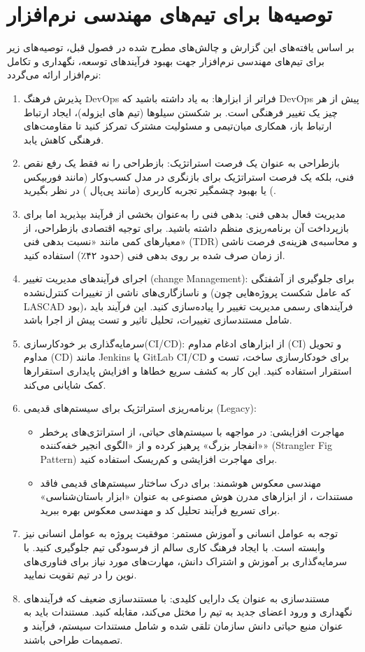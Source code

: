 \section{توصیه‌ها برای تیم‌های مهندسی نرم‌افزار}
\label{sec:ch6-recommendations}

بر اساس یافته‌های این گزارش و چالش‌های مطرح شده در فصول قبل، توصیه‌های زیر برای تیم‌های مهندسی نرم‌افزار جهت بهبود فرآیندهای توسعه، نگهداری و تکامل نرم‌افزار ارائه می‌گردد:

\begin{enumerate}
    \item پذیرش فرهنگ DevOps فراتر از ابزارها: به یاد داشته باشید که DevOps پیش از هر چیز یک تغییر فرهنگی است. بر شکستن سیلوها (تیم های ایزوله)، ایجاد ارتباط ارتباط باز، همکاری میان‌تیمی و مسئولیت مشترک تمرکز کنید تا مقاومت‌های فرهنگی کاهش یابد.
    \item بازطراحی به عنوان یک فرصت استراتژیک: بازطراحی را نه فقط یک رفع نقص فنی، بلکه یک فرصت استراتژیک برای بازنگری در مدل کسب‌وکار (مانند فوربیکس ) یا بهبود چشمگیر تجربه کاربری (مانند پی‌پال ) در نظر بگیرید.
    \item مدیریت فعال بدهی فنی: بدهی فنی را به‌عنوان بخشی از فرآیند بپذیرید اما برای بازپرداخت آن برنامه‌ریزی منظم داشته باشید. برای توجیه اقتصادی بازطراحی، از معیارهای کمی مانند «نسبت بدهی فنی» (TDR) و محاسبه‌ی هزینه‌ی فرصت ناشی از زمان صرف شده بر روی بدهی فنی (حدود ۴۲٪) استفاده کنید.
    \item اجرای فرآیندهای مدیریت تغییر (change Management): برای جلوگیری از آشفتگی و ناسازگاری‌های ناشی از تغییرات کنترل‌نشده (که عامل شکست پروژه‌هایی چون LASCAD بود)، فرآیندهای رسمی مدیریت تغییر را پیاده‌سازی کنید. این فرآیند باید شامل مستندسازی تغییرات، تحلیل تاثیر و تست پیش از اجرا باشد.
    \item سرمایه‌گذاری بر خودکارسازی(CI/CD): از ابزارهای ادغام مداوم (CI) و تحویل مداوم (CD) مانند Jenkins یا GitLab CI/CD برای خودکارسازی ساخت، تست و استقرار استفاده کنید. این کار به کشف سریع خطاها و افزایش پایداری استقرارها کمک شایانی می‌کند.
    \item برنامه‌ریزی استراتژیک برای سیستم‌های قدیمی (Legacy):
    \begin{itemize}
        \item مهاجرت افزایشی: در مواجهه با سیستم‌های حیاتی، از استراتژی‌های پرخطر «انفجار بزرگ» پرهیز کرده و از «الگوی انجیر خفه‌کننده» (Strangler Fig Pattern) برای مهاجرت افزایشی و کم‌ریسک استفاده کنید.
        \item مهندسی معکوس هوشمند: برای درک ساختار سیستم‌های قدیمی فاقد مستندات ، از ابزارهای مدرن هوش مصنوعی به عنوان «ابزار باستان‌شناسی» برای تسریع فرآیند تحلیل کد و مهندسی معکوس بهره ببرید.
    \end{itemize}
    \item توجه به عوامل انسانی و آموزش مستمر: موفقیت پروژه به عوامل انسانی نیز وابسته است. با ایجاد فرهنگ کاری سالم از فرسودگی تیم جلوگیری کنید. با سرمایه‌گذاری بر آموزش و اشتراک دانش، مهارت‌های مورد نیاز برای فناوری‌های نوین را در تیم تقویت نمایید.
    \item مستندسازی به عنوان یک دارایی کلیدی: با مستندسازی ضعیف که فرآیندهای نگهداری و ورود اعضای جدید به تیم را مختل می‌کند، مقابله کنید. مستندات باید به عنوان منبع حیاتی دانش سازمان تلقی شده و شامل مستندات سیستم، فرآیند و تصمیمات طراحی باشند.
\end{enumerate}
